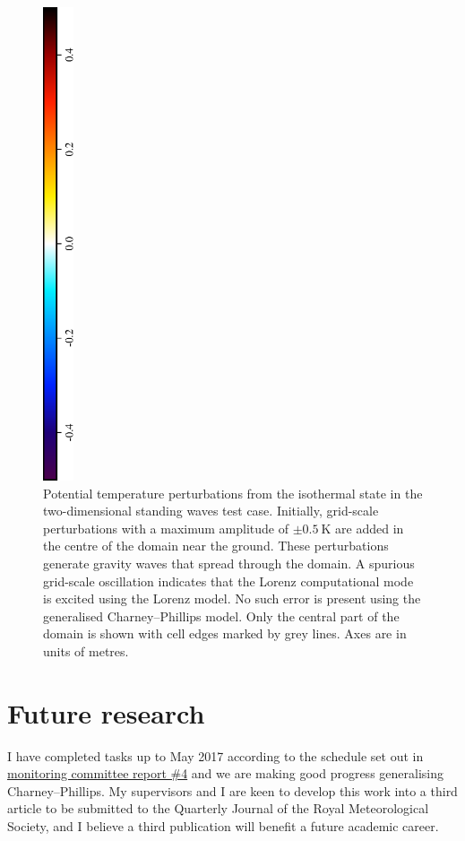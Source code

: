 \documentclass[a4paper,11pt]{article}
\begin{document}
\begin{figure}
\includegraphics[height=5.5in,angle=270]{theta-diff-legend.eps}
\caption{Potential temperature perturbations from the isothermal state in the two-dimensional standing waves test case.  Initially, grid-scale perturbations with a maximum amplitude of $\pm \SI{0.5}{\kelvin}$ are added in the centre of the domain near the ground.  These perturbations generate gravity waves that spread through the domain.  A spurious grid-scale oscillation indicates that the Lorenz computational mode is excited using the Lorenz model.  No such error is present using the generalised Charney--Phillips model.
Only the central part of the domain is shown with cell edges marked by grey lines.
Axes are in units of metres.
}
\label{fig:cp-results}
\end{figure}

\section{Future research}

I have completed tasks up to May 2017 according to the schedule set out in \href{http://www.datumedge.co.uk/publications/mc-report-2016-11.pdf}{monitoring committee report \#4} and we are making good progress generalising Charney--Phillips.  My supervisors and I are keen to develop this work into a third article to be submitted to the Quarterly Journal of the Royal Meteorological Society, and I believe a third publication will benefit a future academic career.
\end{document}
